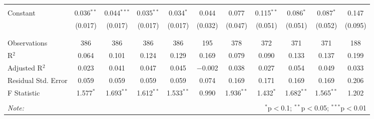 \begin{table}[H]
\begin{tabular}{@{\extracolsep{4pt}}lcccccccccc}
  & & & & & & & & & & \\ 
 Constant & 0.036$^{**}$ & 0.044$^{***}$ & 0.035$^{**}$ & 0.034$^{*}$ & 0.044 & 0.077 & 0.115$^{**}$ & 0.086$^{*}$ & 0.087$^{*}$ & 0.147 \\ 
  & (0.017) & (0.017) & (0.017) & (0.017) & (0.032) & (0.047) & (0.051) & (0.051) & (0.052) & (0.095) \\ 
  & & & & & & & & & & \\ 
\hline \\[-1.8ex] 
Observations & 386 & 386 & 386 & 386 & 195 & 378 & 372 & 371 & 371 & 188 \\ 
R$^{2}$ & 0.064 & 0.101 & 0.124 & 0.129 & 0.169 & 0.079 & 0.090 & 0.133 & 0.137 & 0.199 \\ 
Adjusted R$^{2}$ & 0.023 & 0.041 & 0.047 & 0.045 & $-$0.002 & 0.038 & 0.027 & 0.054 & 0.049 & 0.033 \\ 
Residual Std. Error & 0.059 & 0.059 & 0.059 & 0.059 & 0.074 & 0.169 & 0.171 & 0.169 & 0.169 & 0.206 \\ 
F Statistic & 1.577$^{*}$ & 1.693$^{**}$ & 1.612$^{**}$ & 1.533$^{**}$ & 0.990 & 1.936$^{**}$ & 1.432$^{*}$ & 1.682$^{**}$ & 1.565$^{**}$ & 1.202 \\ 
\hline 
\hline \\[-1.8ex] 
\textit{Note:}  & \multicolumn{10}{r}{$^{*}$p$<$0.1; $^{**}$p$<$0.05; $^{***}$p$<$0.01} \\ 
\end{tabular} 
\end{table} 
